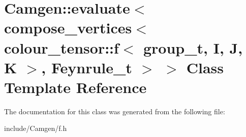 \hypertarget{a00170}{}\section{Camgen\+:\+:evaluate$<$ compose\+\_\+vertices$<$ colour\+\_\+tensor\+:\+:f$<$ group\+\_\+t, I, J, K $>$, Feynrule\+\_\+t $>$ $>$ Class Template Reference}
\label{a00170}


The documentation for this class was generated from the following file\+:\begin{DoxyCompactItemize}
\item 
include/\+Camgen/f.\+h\end{DoxyCompactItemize}
